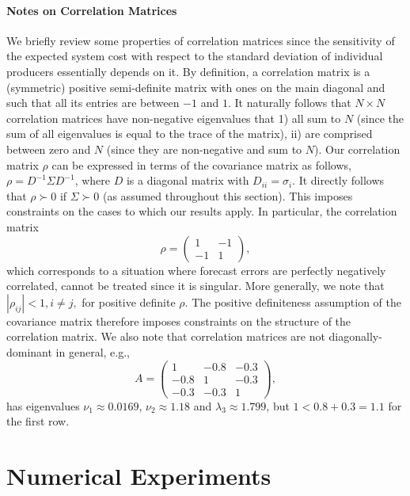 \documentclass{article}
\begin{document}
\paragraph{Notes on Correlation Matrices} We briefly review some properties of correlation matrices since the sensitivity of the expected system cost with respect to the standard deviation of individual producers essentially depends on it. By definition, a correlation matrix is a (symmetric) positive semi-definite matrix with ones on the main diagonal and such that all its entries are between $-1$ and $1$. It naturally follows that $N \times N$ correlation matrices have non-negative eigenvalues that 1) all sum to $N$ (since the sum of all eigenvalues is equal to the trace of the matrix), ii) are comprised between zero and $N$ (since they are non-negative and sum to $N$). Our correlation matrix $\rho$ can be expressed in terms of the covariance matrix as follows, $\rho = D^{-1} \Sigma D^{-1}$, where $D$ is a diagonal matrix with $D_{ii} = \sigma_i$. It directly follows that $\rho \succ 0$ if $\Sigma \succ 0$ (as assumed throughout this section). This imposes constraints on the cases to which our results apply. In particular, the correlation matrix
\begin{equation*}
\rho = \begin{pmatrix} 1 & -1 \\ -1 & 1 \end{pmatrix},
\end{equation*}
which corresponds to a situation where forecast errors are perfectly negatively correlated, cannot be treated since it is singular. More generally, we note that $|\rho_{ij}| < 1, i \ne j,$ for positive definite $\rho$. The positive definiteness assumption of the covariance matrix therefore imposes constraints on the structure of the correlation matrix. We also note that correlation matrices are not diagonally-dominant in general, e.g.,
\begin{equation*}
A = \begin{pmatrix} 1 & -0.8 & -0.3 \\ -0.8 & 1 & -0.3 \\ -0.3 & -0.3 & 1 \end{pmatrix},
\end{equation*}
has eigenvalues $\nu_1 \approx 0.0169$, $\nu_2 \approx 1.18$ and $\lambda_3 \approx 1.799$, but $1 < 0.8 + 0.3 = 1.1$ for the first row.

\section{Numerical Experiments}
\end{document}
